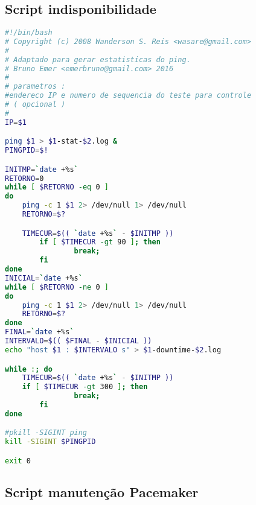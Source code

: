 
\chapter{}
\label{cap:apscripts}

\section{Script indisponibilidade}
\label{ap:scriptindisp}

\begin{lstlisting}[language=bash]
#!/bin/bash
# Copyright (c) 2008 Wanderson S. Reis <wasare@gmail.com>
#
# Adaptado para gerar estatisticas do ping.
# Bruno Emer <emerbruno@gmail.com> 2016
#
# parametros :
#endereco IP e numero de sequencia do teste para controle
# ( opcional )
#
IP=$1

ping $1 > $1-stat-$2.log &
PINGPID=$!

INITMP=`date +%s`
RETORNO=0
while [ $RETORNO -eq 0 ]
do
	ping -c 1 $1 2> /dev/null 1> /dev/null
	RETORNO=$?

	TIMECUR=$(( `date +%s` - $INITMP ))
        if [ $TIMECUR -gt 90 ]; then
                break;
        fi
done
INICIAL=`date +%s`
while [ $RETORNO -ne 0 ]
do
	ping -c 1 $1 2> /dev/null 1> /dev/null
	RETORNO=$?
done
FINAL=`date +%s`
INTERVALO=$(( $FINAL - $INICIAL ))
echo "host $1 : $INTERVALO s" > $1-downtime-$2.log

while :; do
	TIMECUR=$(( `date +%s` - $INITMP ))
	if [ $TIMECUR -gt 300 ]; then
                break;
        fi
done

#pkill -SIGINT ping
kill -SIGINT $PINGPID

exit 0
\end{lstlisting}


\section{Script manutenção Pacemaker}
\label{ap:scriptmanutencao}

